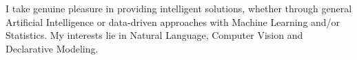 

\begin{cvparagraph}


\begin{justify}

I take genuine pleasure in providing intelligent
solutions, whether through general Artificial Intelligence or data-driven
approaches with Machine Learning and/or Statistics. My interests lie in
Natural Language, Computer Vision and Declarative Modeling.


\end{justify}


\end{cvparagraph}
